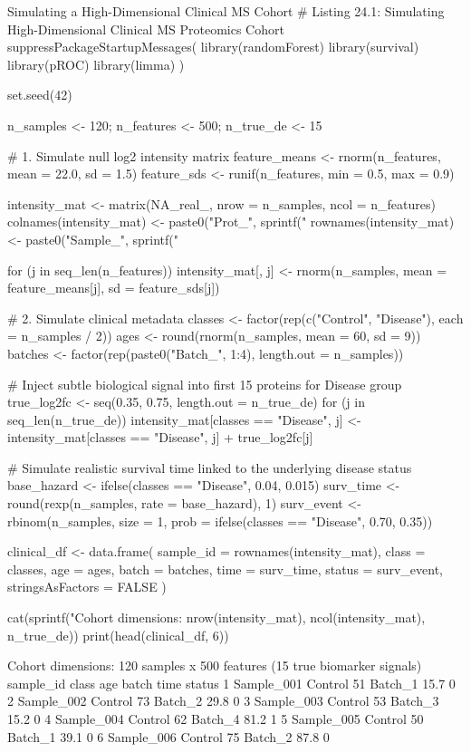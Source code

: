 \documentclass[11pt,twoside,openright]{book}
\begin{document}
\begin{rchunk}{Simulating a High-Dimensional Clinical MS Cohort}
# Listing 24.1: Simulating High-Dimensional Clinical MS Proteomics Cohort
suppressPackageStartupMessages({
  library(randomForest)
  library(survival)
  library(pROC)
  library(limma)
})

set.seed(42)

n_samples  <- 120; n_features <- 500; n_true_de  <- 15

# 1. Simulate null log2 intensity matrix
feature_means <- rnorm(n_features, mean = 22.0, sd = 1.5)
feature_sds   <- runif(n_features, min = 0.5, max = 0.9)

intensity_mat <- matrix(NA_real_, nrow = n_samples, ncol = n_features)
colnames(intensity_mat) <- paste0("Prot_", sprintf("%
rownames(intensity_mat) <- paste0("Sample_", sprintf("%

for (j in seq_len(n_features)) {
  intensity_mat[, j] <- rnorm(n_samples, mean = feature_means[j], sd = feature_sds[j])
}

# 2. Simulate clinical metadata
classes <- factor(rep(c("Control", "Disease"), each = n_samples / 2))
ages    <- round(rnorm(n_samples, mean = 60, sd = 9))
batches <- factor(rep(paste0("Batch_", 1:4), length.out = n_samples))

# Inject subtle biological signal into first 15 proteins for Disease group
true_log2fc <- seq(0.35, 0.75, length.out = n_true_de)
for (j in seq_len(n_true_de)) {
  intensity_mat[classes == "Disease", j] <- intensity_mat[classes == "Disease", j] + true_log2fc[j]
}

# Simulate realistic survival time linked to the underlying disease status
base_hazard <- ifelse(classes == "Disease", 0.04, 0.015)
surv_time   <- round(rexp(n_samples, rate = base_hazard), 1)
surv_event  <- rbinom(n_samples, size = 1, prob = ifelse(classes == "Disease", 0.70, 0.35))

clinical_df <- data.frame(
  sample_id = rownames(intensity_mat), class = classes, age = ages,
  batch = batches, time = surv_time, status = surv_event,
  stringsAsFactors = FALSE
)

cat(sprintf("Cohort dimensions: %
            nrow(intensity_mat), ncol(intensity_mat), n_true_de))
print(head(clinical_df, 6))
\end{rchunk}

\begin{routput}
Cohort dimensions: 120 samples x 500 features (15 true biomarker signals)
   sample\_id   class age   batch time status
1 Sample\_001 Control  51 Batch\_1 15.7      0
2 Sample\_002 Control  73 Batch\_2 29.8      0
3 Sample\_003 Control  53 Batch\_3 15.2      0
4 Sample\_004 Control  62 Batch\_4 81.2      1
5 Sample\_005 Control  50 Batch\_1 39.1      0
6 Sample\_006 Control  75 Batch\_2 87.8      0
\end{routput}
\end{document}
